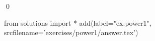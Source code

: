 
\begin{ex} 
  \label{ex:power1}
  
  \qed
\end{ex} 
\begin{python0}
from solutions import *
add(label="ex:power1",
    srcfilename='exercises/power1/answer.tex') 
\end{python0}
